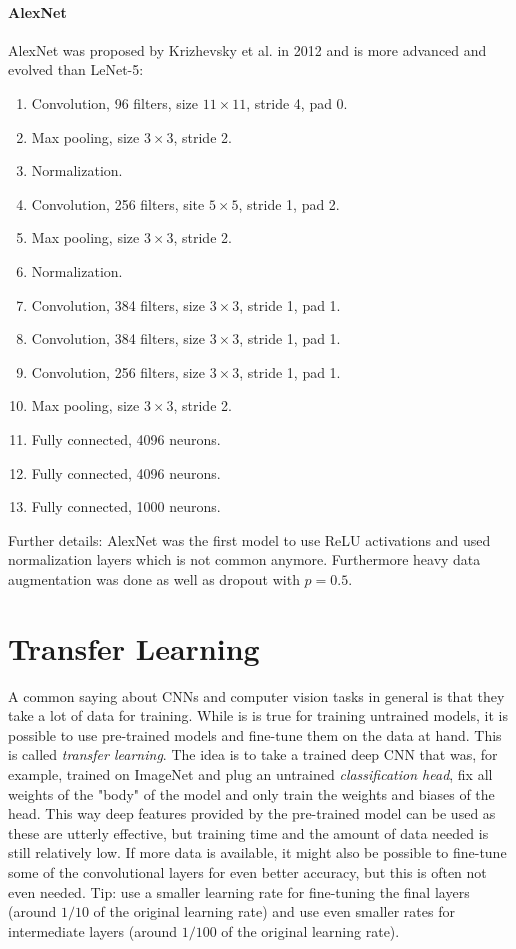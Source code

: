 		\paragraph{AlexNet}
			AlexNet was proposed by Krizhevsky et al. in 2012 and is more advanced and evolved than LeNet-5:
			\begin{enumerate}
				\item Convolution, \num{96} filters, size \( 11 \times 11 \), stride \num{4}, pad \num{0}.
				\item Max pooling, size \(3 \times 3\), stride \num{2}.
				\item Normalization.
				\item Convolution, \num{256} filters, site \(5 \times 5\), stride \num{1}, pad \num{2}.
				\item Max pooling, size \(3 \times 3\), stride \num{2}.
				\item Normalization.
				\item Convolution, \num{384} filters, size \(3 \times 3\), stride \num{1}, pad \num{1}.
				\item Convolution, \num{384} filters, size \(3 \times 3\), stride \num{1}, pad \num{1}.
				\item Convolution, \num{256} filters, size \(3 \times 3\), stride \num{1}, pad \num{1}.
				\item Max pooling, size \(3 \times 3\), stride \num{2}.
				\item Fully connected, \num{4096} neurons.
				\item Fully connected, \num{4096} neurons.
				\item Fully connected, \num{1000} neurons.
			\end{enumerate}
			Further details: AlexNet was the first model to use ReLU activations and used normalization layers which is not common anymore. Furthermore heavy data augmentation was done as well as dropout with \(p = 0.5\).

	\section{Transfer Learning}
		A common saying about CNNs and computer vision tasks in general is that they take a lot of data for training. While is is true for training untrained models, it is possible to use pre-trained models and fine-tune them on the data at hand. This is called \emph{transfer learning}. The idea is to take a trained deep CNN that was, for example, trained on ImageNet and plug an untrained \emph{classification head}, fix all weights of the "body" of the model and only train the weights and biases of the head. This way deep features provided by the pre-trained model can be used as these are utterly effective, but training time and the amount of data needed is still relatively low. If more data is available, it might also be possible to fine-tune some of the convolutional layers for even better accuracy, but this is often not even needed. Tip: use a smaller learning rate for fine-tuning the final layers (around \(1/10\) of the original learning rate) and use even smaller rates for intermediate layers (around \(1/100\) of the original learning rate).

